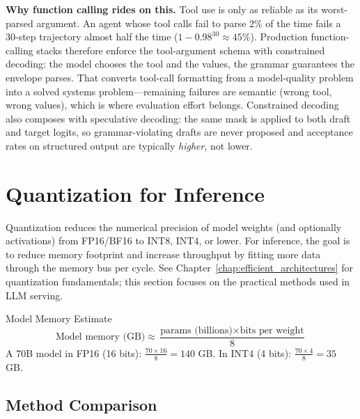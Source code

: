 \textbf{Why function calling rides on this.} Tool use is only as reliable as its worst-parsed argument. An agent whose tool calls fail to parse 2\% of the time fails a 30-step trajectory almost half the time ($1 - 0.98^{30} \approx 45\%$). Production function-calling stacks therefore enforce the tool-argument schema with constrained decoding: the model chooses the tool and the values, the grammar guarantees the envelope parses. That converts tool-call formatting from a model-quality problem into a solved systems problem---remaining failures are semantic (wrong tool, wrong values), which is where evaluation effort belongs. Constrained decoding also composes with speculative decoding: the same mask is applied to both draft and target logits, so grammar-violating drafts are never proposed and acceptance rates on structured output are typically \textit{higher}, not lower.

\section{Quantization for Inference}
\label{sec:quant_inference}

Quantization reduces the numerical precision of model weights (and optionally activations) from FP16/BF16 to INT8, INT4, or lower. For inference, the goal is to reduce memory footprint and increase throughput by fitting more data through the memory bus per cycle. See Chapter~\ref{chap:efficient_architectures} for quantization fundamentals; this section focuses on the practical methods used in LLM serving.

\begin{mathresult}{Model Memory Estimate}
\[
\text{Model memory (GB)} \approx \frac{\text{params (billions)} \times \text{bits per weight}}{8}
\]
A 70B model in FP16 (16 bits): $\frac{70 \times 16}{8} = 140$ GB. In INT4 (4 bits): $\frac{70 \times 4}{8} = 35$ GB.
\end{mathresult}

\subsection{Method Comparison}

